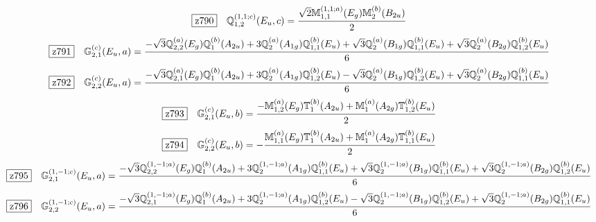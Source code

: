 \documentclass[fleqn,10pt,landscape]{jsarticle}
\begin{document}
\begin{dmath*}
\hspace*{3mm}\fbox{z790}\quad \mathbb{Q}_{1,2}^{(1,1;c)}(E_{u},c)=\frac{\sqrt{2} \mathbb{M}_{1,1}^{(1,1;a)}(E_{g}) \mathbb{M}_{2}^{(b)}(B_{2u})}{2}
\end{dmath*}
\begin{dmath*}
\hspace*{3mm}\fbox{z791}\quad \mathbb{G}_{2,1}^{(c)}(E_{u},a)=\frac{- \sqrt{3} \mathbb{Q}_{2,2}^{(a)}(E_{g}) \mathbb{Q}_{1}^{(b)}(A_{2u}) + 3 \mathbb{Q}_{2}^{(a)}(A_{1g}) \mathbb{Q}_{1,1}^{(b)}(E_{u}) + \sqrt{3} \mathbb{Q}_{2}^{(a)}(B_{1g}) \mathbb{Q}_{1,1}^{(b)}(E_{u}) + \sqrt{3} \mathbb{Q}_{2}^{(a)}(B_{2g}) \mathbb{Q}_{1,2}^{(b)}(E_{u})}{6}
\end{dmath*}
\begin{dmath*}
\hspace*{3mm}\fbox{z792}\quad \mathbb{G}_{2,2}^{(c)}(E_{u},a)=\frac{- \sqrt{3} \mathbb{Q}_{2,1}^{(a)}(E_{g}) \mathbb{Q}_{1}^{(b)}(A_{2u}) + 3 \mathbb{Q}_{2}^{(a)}(A_{1g}) \mathbb{Q}_{1,2}^{(b)}(E_{u}) - \sqrt{3} \mathbb{Q}_{2}^{(a)}(B_{1g}) \mathbb{Q}_{1,2}^{(b)}(E_{u}) + \sqrt{3} \mathbb{Q}_{2}^{(a)}(B_{2g}) \mathbb{Q}_{1,1}^{(b)}(E_{u})}{6}
\end{dmath*}
\begin{dmath*}
\hspace*{3mm}\fbox{z793}\quad \mathbb{G}_{2,1}^{(c)}(E_{u},b)=\frac{- \mathbb{M}_{1,2}^{(a)}(E_{g}) \mathbb{T}_{1}^{(b)}(A_{2u}) + \mathbb{M}_{1}^{(a)}(A_{2g}) \mathbb{T}_{1,2}^{(b)}(E_{u})}{2}
\end{dmath*}
\begin{dmath*}
\hspace*{3mm}\fbox{z794}\quad \mathbb{G}_{2,2}^{(c)}(E_{u},b)=- \frac{\mathbb{M}_{1,1}^{(a)}(E_{g}) \mathbb{T}_{1}^{(b)}(A_{2u}) + \mathbb{M}_{1}^{(a)}(A_{2g}) \mathbb{T}_{1,1}^{(b)}(E_{u})}{2}
\end{dmath*}
\begin{dmath*}
\hspace*{3mm}\fbox{z795}\quad \mathbb{G}_{2,1}^{(1,-1;c)}(E_{u},a)=\frac{- \sqrt{3} \mathbb{Q}_{2,2}^{(1,-1;a)}(E_{g}) \mathbb{Q}_{1}^{(b)}(A_{2u}) + 3 \mathbb{Q}_{2}^{(1,-1;a)}(A_{1g}) \mathbb{Q}_{1,1}^{(b)}(E_{u}) + \sqrt{3} \mathbb{Q}_{2}^{(1,-1;a)}(B_{1g}) \mathbb{Q}_{1,1}^{(b)}(E_{u}) + \sqrt{3} \mathbb{Q}_{2}^{(1,-1;a)}(B_{2g}) \mathbb{Q}_{1,2}^{(b)}(E_{u})}{6}
\end{dmath*}
\begin{dmath*}
\hspace*{3mm}\fbox{z796}\quad \mathbb{G}_{2,2}^{(1,-1;c)}(E_{u},a)=\frac{- \sqrt{3} \mathbb{Q}_{2,1}^{(1,-1;a)}(E_{g}) \mathbb{Q}_{1}^{(b)}(A_{2u}) + 3 \mathbb{Q}_{2}^{(1,-1;a)}(A_{1g}) \mathbb{Q}_{1,2}^{(b)}(E_{u}) - \sqrt{3} \mathbb{Q}_{2}^{(1,-1;a)}(B_{1g}) \mathbb{Q}_{1,2}^{(b)}(E_{u}) + \sqrt{3} \mathbb{Q}_{2}^{(1,-1;a)}(B_{2g}) \mathbb{Q}_{1,1}^{(b)}(E_{u})}{6}
\end{dmath*}
\end{document}
